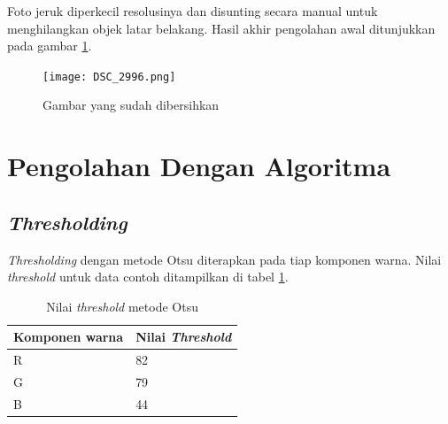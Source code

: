 \documentclass[laporan.tex]{subfiles}
\begin{document}
Foto jeruk diperkecil resolusinya dan disunting secara manual untuk menghilangkan objek latar belakang. Hasil akhir pengolahan awal ditunjukkan pada gambar \ref{fig:imgedited}.


\begin{figure}[h!]
\centering
\texttt{[image: DSC\_2996.png]}
\caption{Gambar yang sudah dibersihkan}
\label{fig:imgedited}
\end{figure}

\section{Pengolahan Dengan Algoritma}

\subsection{\emph{Thresholding}}

\emph{Thresholding} dengan metode Otsu diterapkan pada tiap komponen warna. Nilai \emph{threshold} untuk data contoh ditampilkan di tabel \ref{table:threshval}.

\begin{table}[h]
\centering
\begin{tabular}{|l|l|}
\hline
Komponen warna & Nilai \emph{Threshold} \\
\hline
R & 82 \\
G & 79 \\
B & 44 \\
\hline
\end{tabular}
\caption{Nilai \emph{threshold} metode Otsu}
\label{table:threshval}
\end{table}
\end{document}
